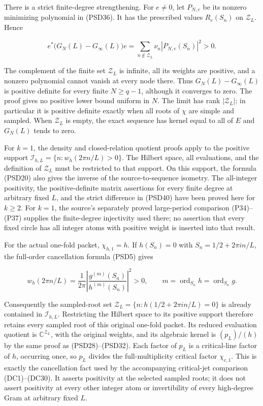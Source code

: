 \documentclass{article}
\begin{document}
There is a strict finite-degree strengthening. For \(e \ne  0\), let \(P_{N,e}\) be its nonzero minimizing polynomial in (PSD36). It has the prescribed values \(R_e(S_n)\) on \(\mathcal Z_L\). Hence

\[
e^*\bigl(G_N(L)-G_\infty(L)\bigr)e
=\sum_{n\notin\mathcal Z_L}\nu_n|P_{N,e}(S_n)|^2>0.
\tag{PSD40}
\]

The complement of the finite set \(\mathcal Z_L\) is infinite, all its weights are positive, and a nonzero polynomial cannot vanish at every node there. Thus \(G_N(L)-G_\infty(L)\) is positive definite for every finite \(N\ge q-1\), although it converges to zero. The proof gives no positive lower bound uniform in \(N\). The limit has rank \(|\mathcal Z_L|\); in particular it is positive definite exactly when all roots of \(\chi\) are simple and sampled. When \(\mathcal Z_L\) is empty, the exact sequence has kernel equal to all of \(E\) and \(G_N(L)\) tends to zero.

For \(k=1\), the density and closed-relation quotient proofs apply to the positive support \(\mathcal I_{h,L}=\{n:w_h(2\pi n/L)>0\}\). The Hilbert space, all evaluations, and the definition of \(\mathcal Z_L\) must be restricted to that support. On this support, the formula (PSD20) also gives the inverse of the source-to-sequence isometry. The all-integer positivity, the positive-definite matrix assertions for every finite degree at arbitrary fixed \(L\), and the strict difference in (PSD40) have been proved here for \(k\ge2\). For \(k=1\), the source's separately proved large-period comparison (P34)--(P37) supplies the finite-degree injectivity used there; no assertion that every fixed circle has all integer atoms with positive weight is inserted into that result.

For the actual one-fold packet, \(\chi_{h,1}=h\). If \(h(S_n)=0\) with \(S_n=1/2+2\pi i n/L\), the full-order cancellation formula (PSD5) gives

\[
w_h(2\pi n/L)=\frac1{2\pi}
\left|\frac{g^{(m)}(S_n)}{h^{(m)}(S_n)}\right|^2>0,
\qquad m=\operatorname{ord}_{S_n}h=\operatorname{ord}_{S_n}g.
\tag{PSD41}
\]

Consequently the sampled-root set \(\mathcal Z_L=\{n:h(1/2+2\pi i n/L)=0\}\) is already contained in \(\mathcal I_{h,L}\). Restricting the Hilbert space to its positive support therefore retains every sampled root of this original one-fold packet. Its reduced evaluation quotient is \(\mathbb C^{\mathcal Z_L}\), with the original weights, and its algebraic kernel is \((p_L)/(h)\) by the same proof as (PSD28)--(PSD32). Each factor of \(p_L\) is a critical-line factor of \(h\), occurring once, so \(p_L\) divides the full-multiplicity critical factor \(\chi_{c,1}\). This is exactly the cancellation fact used by the accompanying critical-jet comparison (DC1)--(DC30). It asserts positivity at the selected sampled roots; it does not assert positivity at every other integer atom or invertibility of every high-degree Gram at arbitrary fixed \(L\).
\end{document}
